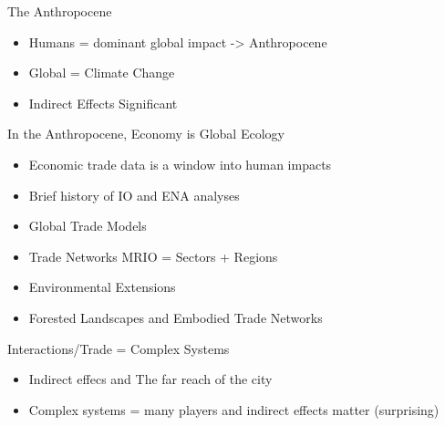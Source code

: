 \documentclass[ignorenonframetext,]{beamer}
\providecommand{\tightlist}{%
  \setlength{\itemsep}{0pt}\setlength{\parskip}{0pt}}
\begin{document}
\begin{frame}{The Anthropocene}

\begin{itemize}
\tightlist
\item
  Humans = dominant global impact -\textgreater{} Anthropocene
\item
  Global = Climate Change
\item
  Indirect Effects Significant
\end{itemize}

\end{frame}

\begin{frame}{In the Anthropocene, Economy is Global Ecology}

\begin{itemize}
\tightlist
\item
  Economic trade data is a window into human impacts
\item
  Brief history of IO and ENA analyses
\item
  Global Trade Models
\item
  Trade Networks MRIO = Sectors + Regions
\item
  Environmental Extensions
\item
  Forested Landscapes and Embodied Trade Networks
\end{itemize}

\end{frame}

\begin{frame}{Interactions/Trade = Complex Systems}

\begin{itemize}
\tightlist
\item
  Indirect effecs and The far reach of the city
\item
  Complex systems = many players and indirect effects matter
  (surprising)
\end{itemize}

\end{frame}
\end{document}
